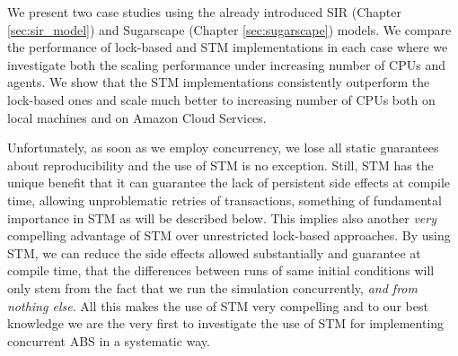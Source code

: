 We present two case studies using the already introduced SIR (Chapter \ref{sec:sir_model}) and Sugarscape (Chapter \ref{sec:sugarscape}) models. We compare the performance of lock-based and STM implementations in each case where we investigate both the scaling performance under increasing number of CPUs and agents. We show that the STM implementations consistently outperform the lock-based ones and scale much better to increasing number of CPUs both on local machines and on Amazon Cloud Services.

Unfortunately, as soon as we employ concurrency, we lose all static guarantees about reproducibility and the use of STM is no exception. Still, STM has the unique benefit that it can guarantee the lack of persistent side effects at compile time, allowing unproblematic retries of transactions, something of fundamental importance in STM as will be described below. This implies also another \textit{very} compelling advantage of STM over unrestricted lock-based approaches. By using STM, we can reduce the side effects allowed substantially and guarantee at compile time, that the differences between runs of same initial conditions will only stem from the fact that we run the simulation concurrently, \textit{and from nothing else}. All this makes the use of STM very compelling and to our best knowledge we are the very first to investigate the use of STM for implementing concurrent ABS in a systematic way.










